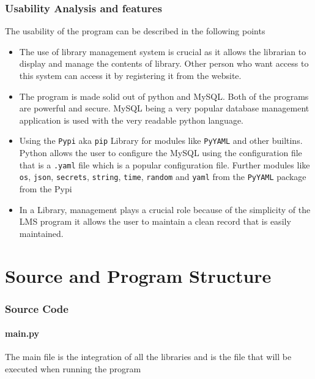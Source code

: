 \documentclass[12pt, a4paper, titlepage, openany]{report}
\begin{document}
\section{Usability Analysis and features}
The usability of the program can be described in the following points
\begin{itemize}
\item The use of library management system is crucial as it allows the librarian to display and manage the contents of library. Other person who want access to this system can access it by registering it from the website.
\item The program is made solid out of python and MySQL. Both of the programs are powerful and secure. MySQL being a very popular database management application is used with the very readable python language.

\item Using the \verb+Pypi+ aka \verb+pip+ Library for modules like \verb+PyYAML+ and other builtins. Python allows the user to configure the MySQL using the configuration file that is a \verb+.yaml+ file which is a popular configuration file. Further modules like \verb+os+, \verb+json+, \verb+secrets+, \verb+string+, \verb+time+, \verb+random+ and \verb+yaml+ from the \verb+PyYAML+ package from the Pypi 
\item In a Library, management plays a crucial role because of the simplicity of the LMS program it allows the user to maintain a clean record that is easily maintained.

\end{itemize}



\newpage
\part{Source and Program Structure}
\section{Source Code}

\subsection{main.py}	

The main file is the integration of all the libraries and is the file that will be executed when running the program \par

\newpage
\end{document}
